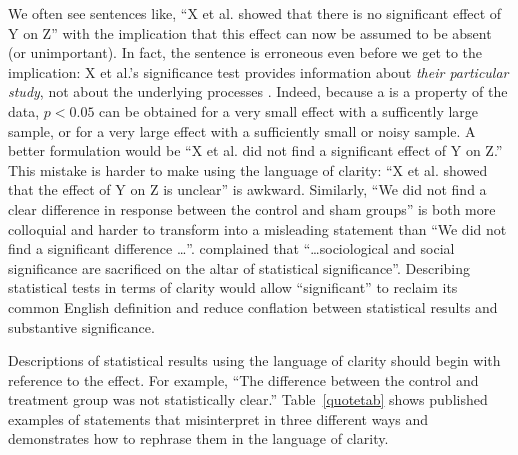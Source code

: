 We often see sentences like, ``X et al. showed that there is no significant effect of Y on Z'' with the implication that this effect can now be assumed to be absent (or unimportant). In fact, the sentence is erroneous even before we get to the implication: X et al.'s significance test provides information about \emph{their particular study}, not about the underlying processes \citep{HoenigandHeisey2001}. Indeed, because a \pval is a property of the data, $p < 0.05$ can be obtained for a very small effect with a sufficently large  sample, or for a very large effect with a sufficiently small or noisy sample. A better formulation would be ``X et al. did not find a significant effect of Y on Z.'' This mistake is harder to make using the language of clarity:  ``X et al. showed that the effect of Y on Z is unclear'' is awkward. Similarly, ``We did not find a clear difference in response between the control and sham groups'' is both more colloquial and harder to transform into a misleading statement than ``We did not find a significant difference \ldots''. \citet{Bernardietal.2017} complained that ``\ldots sociological and social significance are sacrificed on the altar of statistical significance''. Describing statistical tests in terms of clarity would allow ``significant'' to reclaim its common English definition and reduce conflation between statistical results and substantive significance.

Descriptions of statistical results using the language of clarity should begin with reference to the effect. For example, ``The difference between the control and treatment group was not statistically clear.'' Table~\ref{quotetab} shows published examples of statements that misinterpret \pvals in three different ways and demonstrates how to rephrase them in the language of clarity.


